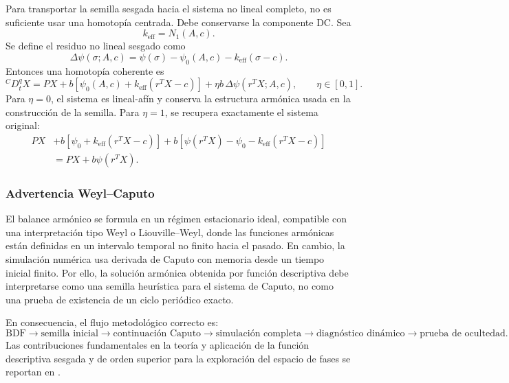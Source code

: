 \documentclass[journal]{IEEEtran}
\begin{document}
Para transportar la semilla sesgada hacia el sistema no lineal completo, no es
suficiente usar una homotop\'{i}a centrada. Debe conservarse la componente DC. Sea
\[
k_{\mathrm{eff}}=N_1(A,c).
\]
Se define el residuo no lineal sesgado como
\begin{equation}
\Delta\psi(\sigma;A,c)
=
\psi(\sigma)-\psi_0(A,c)-k_{\mathrm{eff}}(\sigma-c).
\label{eq:delta_psi_bdf}
\end{equation}
Entonces una homotop\'{i}a coherente es
\begin{equation}
{}^C D_t^q X
=
PX
+
b\left[
\psi_0(A,c)+k_{\mathrm{eff}}(r^TX-c)
\right]
+
\eta b\,\Delta\psi(r^TX;A,c),
\qquad
\eta\in[0,1].
\label{eq:affine_homotopy_bdf}
\end{equation}
Para \(\eta=0\), el sistema es lineal-af\'{i}n y conserva la estructura arm\'{o}nica
usada en la construcci\'{o}n de la semilla. Para \(\eta=1\), se recupera exactamente
el sistema original:
\begin{align}
PX
&+
b\left[
\psi_0+k_{\mathrm{eff}}(r^TX-c)
\right]
+
b\left[
\psi(r^TX)-\psi_0-k_{\mathrm{eff}}(r^TX-c)
\right]
\nonumber\\
&=
PX+b\psi(r^TX).
\end{align}

\subsubsection{Advertencia Weyl--Caputo}

El balance arm\'{o}nico se formula en un r\'{e}gimen estacionario ideal, compatible con
una interpretaci\'{o}n tipo Weyl o Liouville--Weyl, donde las funciones arm\'{o}nicas
est\'{a}n definidas en un intervalo temporal no finito hacia el pasado. En cambio,
la simulaci\'{o}n num\'{e}rica usa derivada de Caputo con memoria desde un tiempo inicial
finito. Por ello, la soluci\'{o}n arm\'{o}nica obtenida por funci\'{o}n descriptiva debe
interpretarse como una semilla heur\'{i}stica para el sistema de Caputo, no como una
prueba de existencia de un ciclo peri\'{o}dico exacto.

En consecuencia, el flujo metodol\'{o}gico correcto es:
\[
\text{BDF}
\longrightarrow
\text{semilla inicial}
\longrightarrow
\text{continuaci\'{o}n Caputo}
\longrightarrow
\text{simulaci\'{o}n completa}
\longrightarrow
\text{diagn\'{o}stico din\'{a}mico}
\longrightarrow
\text{prueba de ocultedad}.
\]
Las contribuciones fundamentales en la teor\'{i}a y aplicaci\'{o}n de la funci\'{o}n descriptiva sesgada y de orden superior para la exploraci\'{o}n del espacio de fases se reportan en \cite{gelb1968multiple, kochenburger1950frequency, kuznetsov2017localization, nuij2006hosidf}.
\end{document}
